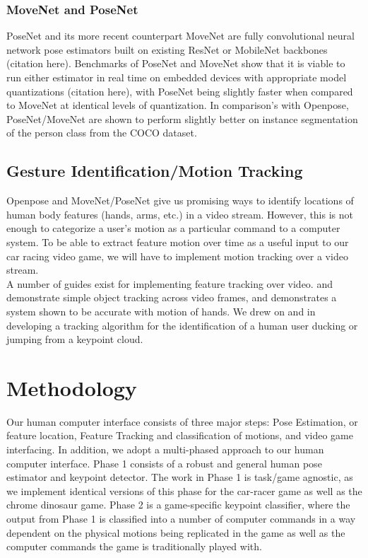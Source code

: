 \documentclass[10pt,twocolumn,letterpaper]{article}
\begin{document}
\subsubsection{MoveNet and PoseNet}

PoseNet and its more recent counterpart MoveNet are fully convolutional neural network pose 
estimators built on existing ResNet or MobileNet backbones (citation here). Benchmarks of PoseNet and MoveNet show that it is 
viable to run either estimator in real time on embedded devices with appropriate 
model quantizations (citation here), with PoseNet being slightly faster when compared to MoveNet at identical 
levels of quantization. In comparison's with Openpose, PoseNet/MoveNet are shown to perform 
slightly better on instance segmentation of the person class from the COCO dataset.

\subsection{Gesture Identification/Motion Tracking}
Openpose and MoveNet/PoseNet give us promising ways to identify locations of human body features 
(hands, arms, etc.) in a video stream. However, this is not enough to categorize a user's motion 
as a particular command to a computer system. To be able to extract feature motion over time 
as a useful input to our car racing video game, we will have to implement motion tracking 
over a video stream.\\ 

A number of guides exist for implementing feature tracking over video. \cite{tracking_1} 
and \cite{tracking_2} demonstrate simple object tracking across video frames, and \cite{tracking_2} 
demonstrates a system shown to be accurate with motion of hands. We drew on \cite{tracking_1} and 
\cite{tracking_2} in developing a tracking algorithm for the identification of a human user ducking 
or jumping from a keypoint cloud.

\section{Methodology}
Our human computer interface consists of three major steps: Pose Estimation, or feature 
location, Feature Tracking and classification of motions, and video game interfacing. In addition, 
we adopt a multi-phased approach to our human computer interface. Phase 1 consists of a robust and 
general human pose estimator and keypoint detector. The work in Phase 1 is task/game agnostic, as 
we implement identical versions of this phase for the car-racer game as well as the chrome 
dinosaur game. Phase 2 is a game-specific keypoint classifier, where the output from Phase 1 is 
classified into a number of computer commands in a way dependent on the physical motions being 
replicated in the game as well as the computer commands the game is traditionally played with.\\
\end{document}
